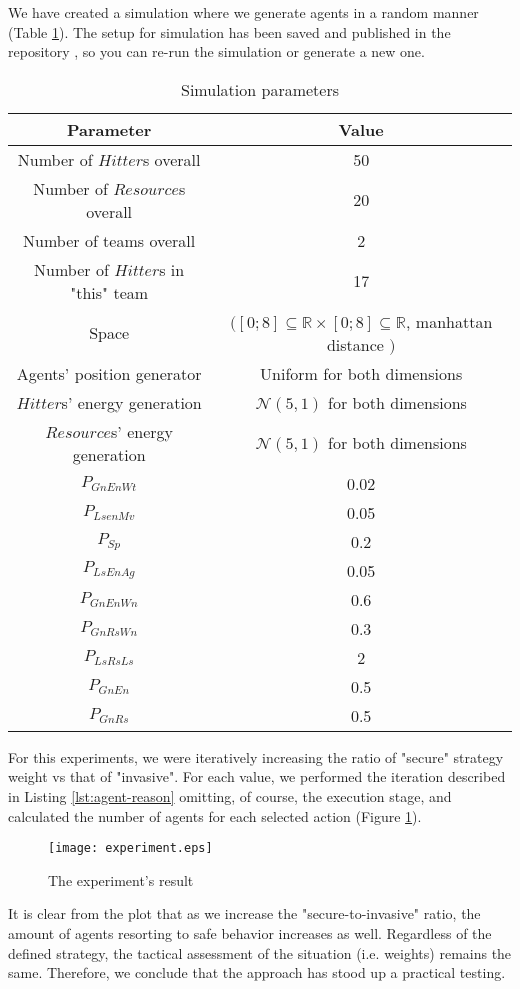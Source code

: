We have created a simulation where we generate agents in a random manner (Table \ref{tab:sim-parameters}). The setup for
simulation has been saved and published in the repository \cite{github}, so you can re-run the simulation or generate a
new one.

\begin{table}[h!]
    \centering
    \caption{Simulation parameters}
    \label{tab:sim-parameters}

    \begin{tabular}[hbt!]{c c}
        Parameter & Value\\
        \hline
        Number of $Hitter$s overall & 50 \\
        Number of $Resource$s overall & 20 \\
        Number of teams overall & 2 \\
        Number of $Hitter$s in "this" team & 17 \\
        Space & $([0;8] \subseteq \mathbb{R} \times [0;8] \subseteq \mathbb{R}$, manhattan distance $)$ \\
        Agents' position generator & Uniform for both dimensions \\
        $Hitter$s' energy generation & $\mathcal{N} (5,1)$ for both dimensions\\
        $Resource$s' energy generation & $\mathcal{N} (5,1)$ for both dimensions\\
        $P_{GnEnWt}$ & 0.02\\
        $P_{LsenMv}$ & 0.05\\
        $P_{Sp}$     & 0.2\\
        $P_{LsEnAg}$ & 0.05\\
        $P_{GnEnWn}$ & 0.6\\
        $P_{GnRsWn}$ & 0.3\\
        $P_{LsRsLs}$ & 2\\
        $P_{GnEn}$   & 0.5\\
        $P_{GnRs}$   & 0.5\\
        \hline
    \end{tabular}
\end{table}

For this experiments, we were iteratively increasing the ratio of "secure" strategy weight vs that of "invasive". For
each value, we performed the iteration described in Listing \ref{lst:agent-reason} omitting, of course, the execution
stage, and calculated the number of agents for each selected action (Figure \ref{fig:experiment}).

\begin{figure}[hbt!]
    \centering
    \texttt{[image: experiment.eps]}

    \caption{\small The experiment's result}
    \label{fig:experiment}
\end{figure}

It is clear from the plot that as we increase the "secure-to-invasive" ratio, the amount of agents resorting to safe
behavior increases as well. Regardless of the defined strategy, the tactical assessment of the situation (i.e. weights)
remains the same. Therefore, we conclude that the approach has stood up a practical testing.
